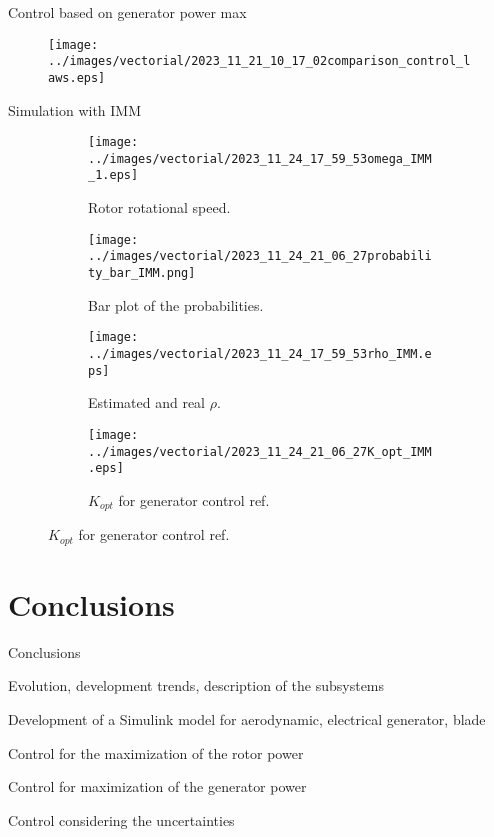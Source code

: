 \begin{frame}{Control based on generator power max}
  \begin{figure}
    \centering
    \texttt{[image: ../images/vectorial/2023\_11\_21\_10\_17\_02comparison\_control\_laws.eps]}
  \end{figure}
\end{frame}

\begin{frame}{Simulation with IMM}
  \begin{figure}[!htbp]
    \begin{subfigure}{0.49\columnwidth}
      \centering
      \texttt{[image: ../images/vectorial/2023\_11\_24\_17\_59\_53omega\_IMM\_1.eps]}
      \caption{Rotor rotational speed.}
    \end{subfigure}
    \begin{subfigure}{0.49\columnwidth}
      \centering
      \texttt{[image: ../images/vectorial/2023\_11\_24\_21\_06\_27probability\_bar\_IMM.png]}
      \caption{Bar plot of the probabilities.}
    \end{subfigure}
    \begin{subfigure}{0.49\columnwidth}
      \centering
      \texttt{[image: ../images/vectorial/2023\_11\_24\_17\_59\_53rho\_IMM.eps]}
      \caption{Estimated and real $\rho$.}
    \end{subfigure}
    \begin{subfigure}{0.49\columnwidth}
      \centering
      \texttt{[image: ../images/vectorial/2023\_11\_24\_21\_06\_27K\_opt\_IMM.eps]}
      \caption{$K_{opt}$ for generator control ref. }
    \end{subfigure}
  \end{figure}
\end{frame}

                                                      
\section{Conclusions}
\begin{frame}{Conclusions}
  \begin{myitemize}
    \item Evolution, development trends, description of the subsystems
    \item Development of a Simulink model for aerodynamic, electrical generator, blade 
    \item Control for the maximization of the rotor power
    \item Control for maximization of the generator power
    \item Control considering the uncertainties
  \end{myitemize}
\end{frame}



